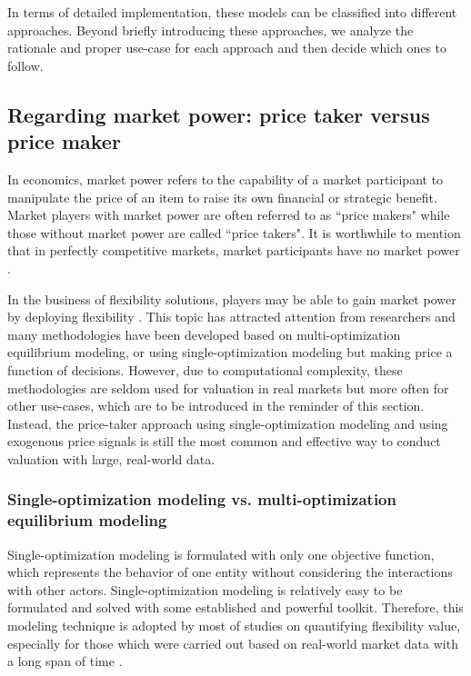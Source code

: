 In terms of detailed implementation, these models can be classified into different approaches. Beyond briefly introducing these approaches, we analyze the rationale and proper use-case for each approach and then decide which ones to follow.

\subsection{Regarding market power: price taker versus price maker}
In economics, market power refers to the capability of a market participant to manipulate the price of an item to raise its own financial or strategic benefit. Market players with market power are often referred to as ``price makers" while those without market power are called ``price takers". It is worthwhile to mention that in perfectly competitive markets, market participants have no market power \cite{Mankiw2011}. 

In the business of flexibility solutions, players may be able to gain market power by deploying flexibility \cite{Zucker2013,Schill2011,He2012}.
This topic has attracted attention from researchers and many methodologies have been developed based on multi-optimization equilibrium modeling, or using single-optimization modeling but making price a function of decisions. However, due to computational complexity, these methodologies are seldom used for valuation in real markets but more often for other use-cases, which are to be introduced in the reminder of this section. Instead, the price-taker approach using single-optimization modeling and using exogenous price signals is still the most common and effective way to conduct valuation with large, real-world data.

\subsubsection{Single-optimization modeling vs. multi-optimization equilibrium modeling}
Single-optimization modeling is formulated with only one objective function, which represents the behavior of one entity without considering the  interactions with other actors. Single-optimization modeling is relatively easy to be formulated and solved with some established and powerful toolkit. Therefore, this modeling technique is adopted by most of studies on quantifying flexibility value, especially for those which were carried out based on real-world market data with a long span of time \cite{Walawalkar2007,Sioshansi2009,Byrne2012,Bradbury2014,McConnell2015,Berrada2016,Salles2017}.

